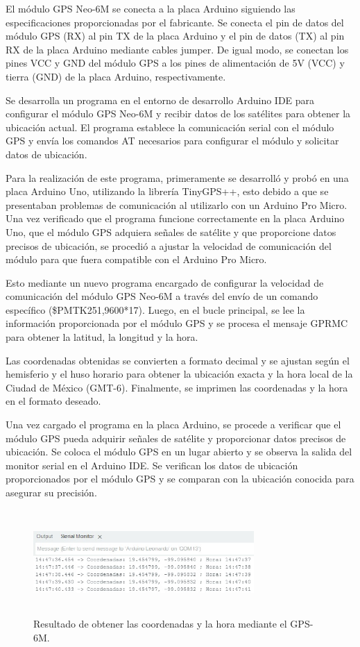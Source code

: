 \begin{itemize}
El módulo GPS Neo-6M se conecta a la placa Arduino siguiendo las especificaciones proporcionadas por el fabricante. Se conecta el pin de datos del módulo GPS (RX) al pin TX de la placa Arduino y el pin de datos (TX) al pin RX de la placa Arduino mediante cables jumper. De igual modo, se conectan los pines VCC y GND del módulo GPS a los pines de alimentación de 5V (VCC) y tierra (GND) de la placa Arduino, respectivamente.

Se desarrolla un programa en el entorno de desarrollo Arduino IDE para configurar el módulo GPS Neo-6M y recibir datos de los satélites para obtener la ubicación actual. El programa establece la comunicación serial con el módulo GPS y envía los comandos AT necesarios para configurar el módulo y solicitar datos de ubicación.

Para la realización de este programa, primeramente se desarrolló y probó en una placa Arduino Uno, utilizando la librería TinyGPS++, esto debido a que se presentaban problemas de comunicación al utilizarlo con un Arduino Pro Micro. Una vez verificado que el programa funcione correctamente en la placa Arduino Uno, que el módulo GPS adquiera señales de satélite y que proporcione datos precisos de ubicación, se procedió a ajustar la velocidad de comunicación del módulo para que fuera compatible con el Arduino Pro Micro.

Esto mediante un nuevo programa encargado de configurar la velocidad de comunicación del módulo GPS Neo-6M a través del envío de un comando específico (\$PMTK251,9600*17). Luego, en el bucle principal, se lee la información proporcionada por el módulo GPS y se procesa el mensaje GPRMC para obtener la latitud, la longitud y la hora.

Las coordenadas obtenidas se convierten a formato decimal y se ajustan según el hemisferio y el huso horario para obtener la ubicación exacta y la hora local de la Ciudad de México (GMT-6). Finalmente, se imprimen las coordenadas y la hora en el formato deseado.

Una vez cargado el programa en la placa Arduino, se procede a verificar que el módulo GPS pueda adquirir señales de satélite y proporcionar datos precisos de ubicación. Se coloca el módulo GPS en un lugar abierto y se observa la salida del monitor serial en el Arduino IDE. Se verifican los datos de ubicación proporcionados por el módulo GPS y se comparan con la ubicación conocida para asegurar su precisión.

\begin{figure}[H]
    \centering
    \includegraphics[width=0.75\textwidth, height=4cm]{imagenes/gps_solo.jpg}
    \caption{Resultado de obtener las coordenadas y la hora mediante el GPS-6M.}
    \label{fig:gps-solo}
\end{figure}


\end{itemize}
